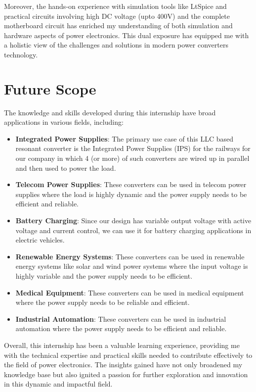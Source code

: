 \noindent
Moreover, the hands-on experience with simulation tools like LtSpice
and practical circuits involving high DC voltage (upto 400V) and the complete
motherboard circuit has enriched my understanding of both simulation and
hardware aspects of power electronics. This dual exposure has equipped
me with a holistic view of the challenges and solutions in modern power
converters technology.

\section{Future Scope}
The knowledge and skills developed during this internship have broad
applications in various fields, including:

\begin{itemize}
    \item \textbf{Integrated Power Supplies}: The primary use case of this LLC based resonant converter is the Integrated Power Supplies (IPS) for the railways for our company in which 4 (or more) of such converters are wired up in parallel and then used to power the load.
    \item \textbf{Telecom Power Supplies}: These converters can be used in telecom power supplies where the load is highly dynamic and the power supply needs to be efficient and reliable.
    \item \textbf{Battery Charging}: Since our design has variable output voltage with active voltage and current control, we can use it for battery charging applications in electric vehicles.
    \item \textbf{Renewable Energy Systems}: These converters can be used in renewable energy systems like solar and wind power systems where the input voltage is highly variable and the power supply needs to be efficient.
    \item \textbf{Medical Equipment}: These converters can be used in medical equipment where the power supply needs to be reliable and efficient.
    \item \textbf{Industrial Automation}: These converters can be used in industrial automation where the power supply needs to be efficient and reliable.
\end{itemize}

\noindent
Overall, this internship has been a valuable learning experience, providing me
with the technical expertise and practical skills needed to contribute
effectively to the field of power electronics. The insights gained have not only
broadened my knowledge base but also ignited a passion for further exploration
and innovation in this dynamic and impactful field.